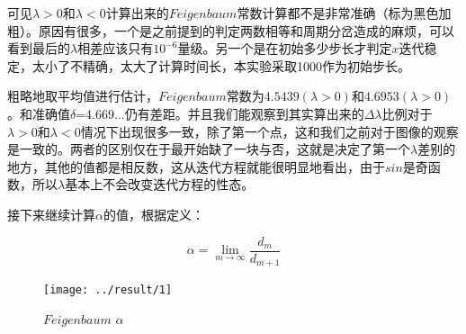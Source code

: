 \documentclass[UTF8]{ctexart}
\begin{document}
	
	
	\begin{flushleft}
		\quad 可见$\lambda>0$和$\lambda<0$计算出来的$Feigenbaum$常数计算都不是非常准确（标为黑色加粗）。原因有很多，一个是之前提到的判定两数相等和周期分岔造成的麻烦，可以看到最后的$\lambda$相差应该只有$10^{-6}$量级。另一个是在初始多少步长才判定$x$迭代稳定，太小了不精确，太大了计算时间长，本实验采取1000作为初始步长。
	\end{flushleft}

\begin{flushleft}
		\quad 粗略地取平均值进行估计，$Feigenbaum$常数为$ 4.5439(\lambda>0)$和$4.6953(\lambda>0)$。和准确值$\delta$=4.669...仍有差距。并且我们能观察到其实算出来的$\Delta\lambda$比例对于$\lambda>0$和$\lambda<0$情况下出现很多一致，除了第一个点，这和我们之前对于图像的观察是一致的。两者的区别仅在于最开始缺了一块与否，这就是决定了第一个$\lambda$差别的地方，其他的值都是相反数，这从迭代方程就能很明显地看出，由于$sin$是奇函数，所以$\lambda$基本上不会改变迭代方程的性态。
\end{flushleft}


\begin{flushleft}
	接下来继续计算$\alpha$的值，根据定义：
\end{flushleft}

$$\alpha=\lim_{m\rightarrow\infty}\frac{d_{m}}{d_{m+1}}$$


	\begin{figure}[H]
	\centering\texttt{[image: ../result/1]}
	\caption{$Feigenbaum\,\,\alpha$}
	\end{figure}
\end{document}
